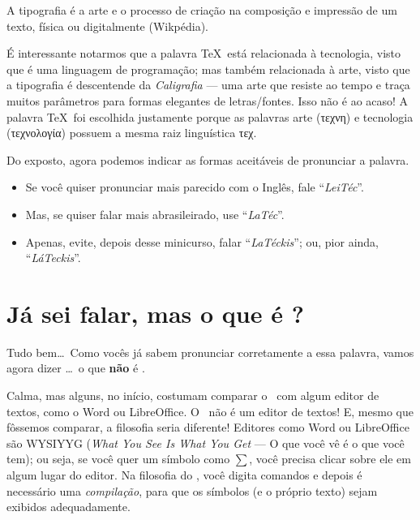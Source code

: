 A tipografia é a arte e o processo de criação na composição e impressão de um 
texto, física ou digitalmente (Wikpédia).

É interessante notarmos que a palavra \TeX\ está relacionada à 
\textsf{tecnologia}, visto que é uma linguagem de programação; mas também 
relacionada à \textsf{arte}, visto que a tipografia é descentende da 
\textit{Caligrafia} --- uma arte que resiste ao tempo e traça muitos parâmetros para formas elegantes de letras/fontes.
Isso não é ao acaso!
A palavra \TeX\ foi escolhida justamente porque as palavras \textsf{arte} 
({\grega τεχνη}) e \textsf{tecnologia} ({\grega τεχνολογία}) possuem a mesma raiz linguística {\grega τεχ}. 

Do exposto, agora podemos indicar as formas aceitáveis de pronunciar a palavra\LaTeXX.

\begin{itemize}
  \item[\emoji{speaking-head}] Se você quiser pronunciar mais parecido com o        Inglês, fale ``\textit{LeiTéc}''. 
  \item[\emoji{speaking-head}] Mas, se quiser falar mais abrasileirado, use 
        ``\textit{LaTéc}''.
  \item[\emoji{prohibited}] Apenas, evite, depois desse minicurso, falar 
        ``\textit{LaTéckis}''; ou, pior ainda, ``\textit{LáTeckis}''. 
\end{itemize}


\section{Já sei falar, mas o que é \LaTeXX?}
\label{sec:word-latex}

Tudo bem\ldots\
Como vocês já sabem pronunciar corretamente a essa palavra, vamos agora
dizer \ldots\ o que \textbf{não} é \LaTeXX. 

Calma, mas alguns, no início, costumam comparar o \LaTeXX\ com algum editor 
de textos, como o Word ou LibreOffice. 
O \LaTeXX\ não é um editor de textos!
E, mesmo que fôssemos comparar, a filosofia seria diferente!
Editores como Word ou LibreOffice são \textsf{WYSIYYG} (\textit{What You See Is What You Get} --- O que você vê é o que você tem); ou seja, se você 
quer um símbolo como $\sum$, você precisa clicar sobre ele em algum lugar
do editor.
Na filosofia do \LaTeXX, você digita comandos e depois é necessário uma 
\textit{compilação}, para que os símbolos (e o próprio texto) sejam 
exibidos adequadamente.

